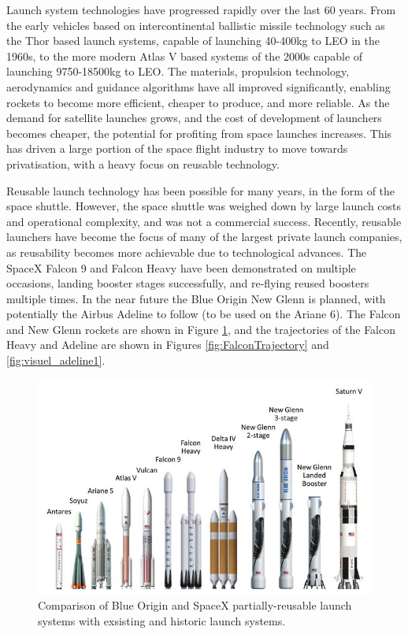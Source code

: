   
  Launch system technologies have progressed rapidly over the last 60 years. From the early vehicles based on intercontinental ballistic missile technology such as the Thor based launch systems, capable of launching 40-400kg to LEO in the 1960s, to the more modern Atlas V based systems of the 2000s capable of launching 9750-18500kg to LEO\cite{Kendall2010}. 
  The materials, propulsion technology, aerodynamics and guidance algorithms have all improved significantly, enabling  rockets to become more efficient, cheaper to produce, and more reliable. As the demand for satellite launches grows, and the cost of development of launchers becomes cheaper, the potential for profiting from space launches increases. 
  This has driven a large portion of the space flight industry to move towards privatisation, with a heavy focus on reusable technology. 
   
  Reusable launch technology has been possible for many years, in the form of the space shuttle. However, the space shuttle was weighed down by large launch costs and operational complexity, and was not a commercial success\cite{Launius2006}. Recently, reusable launchers have become the focus of many of the largest private launch companies, as reusability becomes more achievable due to technological advances\cite{Foust2018,Mosher2018}. The SpaceX Falcon 9 and Falcon Heavy have been demonstrated on multiple occasions, landing booster stages successfully, and re-flying reused boosters multiple times\cite{Foust2018}. In the near future the Blue Origin New Glenn is planned\cite{Foust2018}, with potentially the Airbus Adeline to follow (to be used on the Ariane 6)\cite{Adeline}. The Falcon and New Glenn rockets are shown in Figure \ref{fig:LaunchVehicles}, and the trajectories of the Falcon Heavy and Adeline are shown in Figures \ref{fig:FalconTrajectory} and \ref{fig:visuel_adeline1}.  
  
    \begin{figure}[ht]
    	\centering
    	\includegraphics[width=0.9\linewidth]{figures/2_literature-review/LaunchVehicles}
    	\caption{Comparison of Blue Origin and SpaceX partially-reusable launch systems with exsisting and historic launch systems\cite{BlueOrigin}.}
    	\label{fig:LaunchVehicles}
    \end{figure}
  
